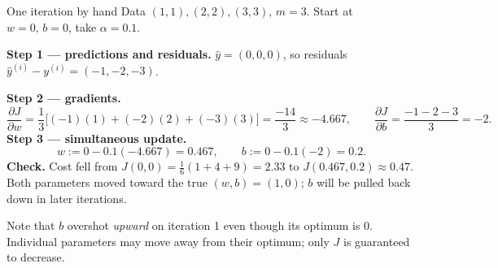 \documentclass[aspectratio=169,10pt]{beamer}
\begin{document}
\begin{frame}{One iteration by hand}
  \small
  Data $(1,1),(2,2),(3,3)$, $m=3$. Start at $w=0,\,b=0$, take $\alpha=0.1$.
  \vspace{1mm}

  \textbf{Step 1 --- predictions and residuals.}
  $\hat y = (0,0,0)$, so residuals $\hat y^{(i)}-y^{(i)} = (-1,-2,-3)$.
  \vspace{1mm}

  \textbf{Step 2 --- gradients.}
  \[
    \frac{\partial J}{\partial w}=\frac{1}{3}\bigl[(-1)(1)+(-2)(2)+(-3)(3)\bigr]
      =\frac{-14}{3}\approx-4.667,
    \qquad
    \frac{\partial J}{\partial b}=\frac{-1-2-3}{3}=-2.
  \]
  \textbf{Step 3 --- simultaneous update.}
  \[
    w := 0 - 0.1(-4.667) = 0.467,\qquad b := 0 - 0.1(-2) = 0.2 .
  \]
  \vspace{1mm}
  \textbf{Check.} Cost fell from $J(0,0)=\tfrac{1}{6}(1+4+9)=2.33$ to
  $J(0.467,0.2)\approx 0.47$. Both parameters moved toward the true
  $(w,b)=(1,0)$; $b$ will be pulled back down in later iterations.
  \vspace{1mm}
  \begin{pitfall}
    Note that $b$ overshot \emph{upward} on iteration 1 even though its optimum is
    $0$. Individual parameters may move away from their optimum; only $J$ is
    guaranteed to decrease.
  \end{pitfall}
\end{frame}
\end{document}
